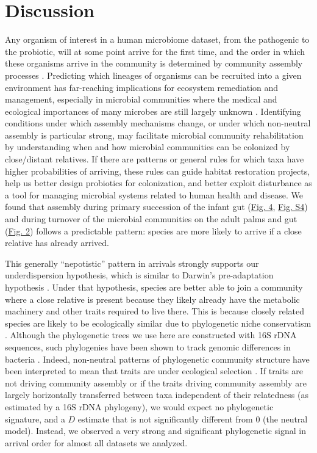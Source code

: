 \documentclass{article}
\begin{document}
\section{Discussion}
Any organism of interest in a human microbiome dataset, from the pathogenic to the probiotic, will at some point arrive for the first time, and the order in which these organisms arrive 
in the community is determined by community assembly processes \cite{Nemergut2013}. Predicting which lineages of organisms can be recruited into a given environment has far-reaching implications for ecosystem remediation and management, especially in microbial communities where the medical and ecological importances of many microbes are still largely unknown \cite{Martiny2015,Vazquez-Baeza2018}. Identifying conditions under which assembly mechanisms change, or under which non-neutral assembly is particular strong, may facilitate microbial community rehabilitation by understanding when and how microbial communities can be colonized by close/distant relatives. If there are patterns or general rules for which taxa have higher probabilities of arriving, these rules can guide habitat restoration projects, help us better design probiotics for colonization, and better exploit disturbance as a tool for managing microbial systems related to human health and disease. We found that assembly during primary succession of the infant gut (\hyperref[sec:figure4]{Fig. 4}, \hyperref[sec:figureS4]{Fig. S4}) and during turnover of the microbial communities on the adult palms and gut (\hyperref[sec:figure2]{Fig. 2}) follows a predictable pattern: species are more likely to arrive if a close relative has already arrived.
\par
This generally “nepotistic” pattern in arrivals strongly supports our underdispersion hypothesis, which is similar to Darwin’s pre-adaptation hypothesis \cite{Darwin1859}. Under that hypothesis, species are better able to join a community where a close relative is present because they likely already have the metabolic machinery and other traits required to live there. This is because closely related species are likely to be ecologically similar due to phylogenetic niche conservatism \cite{Wiens2010}. Although the phylogenetic trees we use here are constructed with 16S rDNA sequences, such phylogenies have been shown to track genomic differences in bacteria \cite{Zaneveld2010,Langille2013}. Indeed, non-neutral patterns of phylogenetic community structure have been interpreted to mean that traits are under ecological selection \cite{Webb2000,Webb2002,CavenderBares2004,Gerhold2015}. If traits are not driving community assembly \cite{Hubbell2001} or if the traits driving community assembly are largely horizontally transferred between taxa independent of their relatedness (as estimated by a 16S rDNA phylogeny), we would expect no phylogenetic signature, and a \(D\) estimate that is not significantly different from 0 (the neutral model). Instead, we observed a very strong and significant phylogenetic signal in arrival order for almost all datasets we analyzed.
\end{document}
